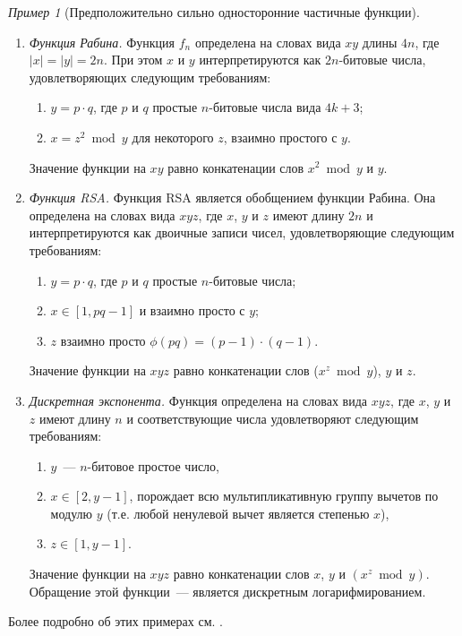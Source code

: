 \documentclass[12pt,a4paper]{article}
\theoremstyle{definition}
\theoremstyle{plain}
\theoremstyle{remark}
\newtheorem{example}{Пример}[section]
\begin{document}
\begin{example}[Предположительно сильно односторонние частичные функции]
\mbox{}
\begin{enumerate}
\item \emph{Функция Рабина.} Функция $f_n$ определена на словах вида $xy$
длины $4n$, где $|x| = |y| = 2n$. При этом $x$ и $y$ интерпретируются как 
$2n$-битовые числа, удовлетворяющих следующим требованиям:
\begin{enumerate}
\item $y = p\cdot q$, где $p$ и $q$ простые $n$-битовые числа вида $4k+3$;
\item $x = z^2 \bmod y$ для некоторого $z$, взаимно простого с $y$.
\end{enumerate}
Значение функции на $xy$ равно конкатенации слов $x^2 \bmod y$ и $y$.

\item \emph{Функция RSA.} Функция RSA является обобщением функции Рабина.
Она определена на словах вида $xyz$, где $x$, $y$ и $z$ имеют длину $2n$
и интерпретируются как двоичные записи чисел, удовлетворяющие следующим
требованиям:
\begin{enumerate}
\item $y = p\cdot q$, где $p$ и $q$ простые $n$-битовые числа;
\item $x \in [1, pq - 1]$ и взаимно просто с $y$;
\item $z$ взаимно просто $\phi(pq) = (p-1)\cdot(q-1)$.
\end{enumerate}
Значение функции на $xyz$ равно конкатенации слов ($x^z \bmod y$), $y$ и $z$.
\item \emph{Дискретная экспонента.} Функция определена на словах вида $xyz$, где $x$, $y$ и $z$ имеют длину $n$ и соответствующие числа удовлетворяют следующим требованиям:
\begin{enumerate}
\item $y$~--- $n$-битовое простое число,
\item $x\in [2,y-1]$, порождает всю мультипликативную группу вычетов
по модулю $y$ (т.е. любой ненулевой вычет является степенью $x$),
\item $z\in [1,y-1]$.
\end{enumerate}
Значение функции на $xyz$ равно конкатенации слов $x$, $y$ и $(x^z\bmod y)$.
Обращение этой функции~--- является дискретным логарифмированием.
\end{enumerate}
Более подробно об этих примерах см. \cite{veresch17}.
\end{example}
\end{document}
